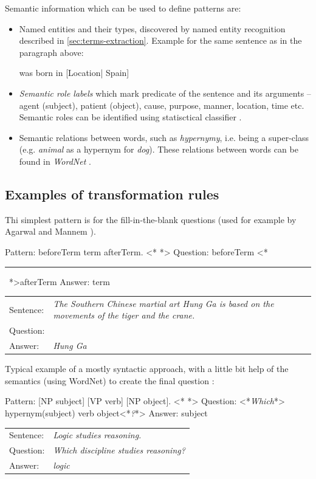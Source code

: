 \documentclass[a4paper, 12pt, twoside]{fithesis2}		%
\makeatletter
\renewcommand{\_}{\leavevmode \kern0.07em\vbox{\hrule width0.4em}}
\newcommand{\squarebullet}{\textcolor{black}{\raisebox{0.15em}{\rule{4pt}{4pt}}}}
\newcommand{\emptysquarebullet}{\textcolor{black}{\raisebox{0.10em}{\tiny$\square$}}}
\newenvironment{myItemize}{
  \begin{itemize}[leftmargin=2em,rightmargin=1em,itemsep=\parskip ,parsep=0em,topsep=0em,partopsep=0em]
  \renewcommand{\labelitemi}{\squarebullet}
  \renewcommand{\labelitemii}{\textbullet}
}{
  \end{itemize}
}
\newcommand{\arrowlinesplit}{%
  \noindent\makebox[\linewidth]{\raisebox{0.15em}{\rule{0.478\textwidth}{0.5pt}}%
  ~$\downarrow$~%
  \noindent\raisebox{0.15em}{\rule{0.478\textwidth}{0.5pt}}}%
}
\newcommand{\sentenceGap}{\rule{1.5cm}{0.4pt}~}
\newcommand{\transformationExample}[3]{%
\vspace{-0.5em}
\noindent %
\begin{tabularx}{\linewidth}{@{} l X @{}}
Sentence: & \emph{#1}\\
Question: & \emph{#2}\\
Answer:   & \emph{#3}\\
  \hline
\end{tabularx}
}
\makeatother
\begin{document}
\noindent
Semantic information which can be used to define patterns are:
\begin{myItemize}
\item Named entities and their types, discovered by named entity recognition described in \autoref{sec:terms-extraction}. Example for the same sentence as in the paragraph above:
\begin{code}
 was born in [Location| Spain]
\end{code}

\item \emph{Semantic role labels} which mark predicate of the sentence and its arguments -- agent (subject), patient (object), cause, purpose, manner, location, time etc.
Semantic roles can be identified using statisctical classifier \cite{semantic-role-labelling}.
\begin{code}
\end{code}

\item Semantic relations between words, such as \emph{hypernymy}, i.e. being a super-class (e.g. \emph{animal} as a hypernym for \emph{dog}). These relations between words can be found in \emph{WordNet} \cite{wordnet}.
\end{myItemize}


\subsection*{Examples of transformation rules}

Thi simplest pattern is for the fill-in-the-blank questions
(used for example by Agarwal and Mannem \cite{question-gen-textbooks}).
\begin{code}
Pattern: beforeTerm term afterTerm.
<*\arrowlinesplit*>
Question: beforeTerm <*\sentenceGap*>afterTerm
Answer: term
\end{code}
\transformationExample%
{The Southern Chinese martial art Hung Ga is based on the movements of the tiger and the crane.}%
{The Southern Chinese martial art \sentenceGap is based on the movements of the tiger and the crane.}%
{Hung Ga}

\noindent
Typical example of a mostly syntactic approach,
with a little bit help of the semantics (using WordNet) to create the final question
\cite{question-gen-mitkov}:
\begin{code}
Pattern: [NP subject] [VP verb] [NP object].
<*\arrowlinesplit*>
Question: <*\emph{Which}*> hypernym(subject) verb object<*\emph{?}*>
Answer: subject
\end{code}
\transformationExample{Logic studies reasoning.}{Which discipline studies reasoning?}{logic}
\end{document}
